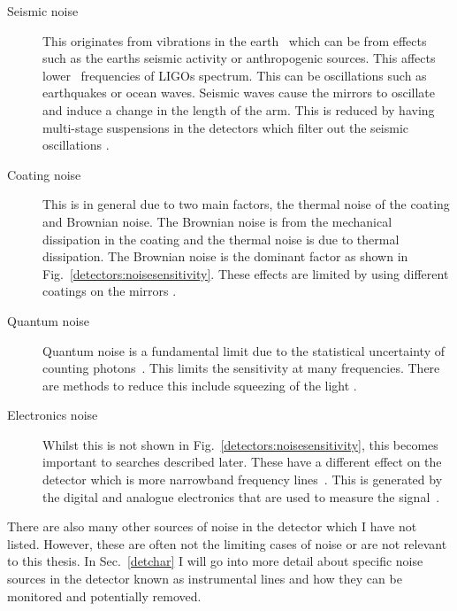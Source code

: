 \begin{description}
\item[Seismic noise] This originates from vibrations in the earth~ which can be from effects such as the earths seismic
activity or anthropogenic sources. This affects lower~ frequencies of \glspl{LIGO} spectrum. This can be oscillations
such as earthquakes or ocean waves. Seismic waves cause the mirrors to
oscillate~ and induce a change
in the length of the arm. This is reduced by having multi-stage suspensions in
the detectors which filter out the seismic oscillations
\citep{matichard2015SeismicIsolation}.

\item[Coating noise] This is in general due to two main factors, the thermal
noise of the coating and Brownian noise. The Brownian noise is from the
mechanical dissipation in the coating and the thermal noise is due to thermal
dissipation. The Brownian noise is the dominant factor as shown in
Fig.~\ref{detectors:noisesensitivity}. These effects are limited by using
different coatings on the mirrors \citep{abernathy0OverviewResearch}.

\item[Quantum noise] Quantum noise is a fundamental limit due to the
statistical uncertainty of counting photons~.
This limits the sensitivity at many frequencies. There are methods to reduce
this include squeezing of the light \citep{aasi2013EnhancedSensitivity}. 

\item[Electronics noise ] Whilst this is not shown
in Fig.~\ref{detectors:noisesensitivity}, this becomes important to searches
described later. These have a different effect on the detector which is more
narrowband frequency lines~. This is generated by the digital and analogue
electronics that are used to measure the signal~.  
\end{description}

There are also many other sources of noise in the detector which I have not
listed. However, these are often not the limiting cases of noise or are not
relevant to this thesis.  In Sec.~\ref{detchar} I will go into more detail
about specific noise sources in the detector known as instrumental lines and
how they can be monitored and potentially removed.~ 













